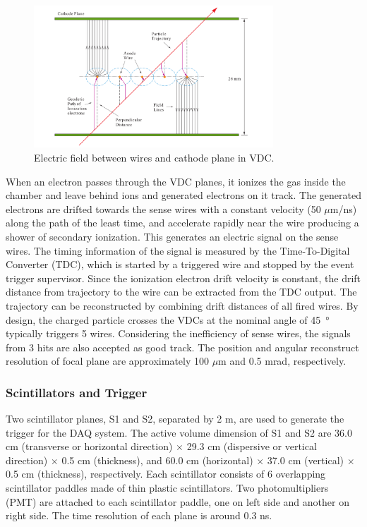 \begin{figure}[tb!]
\centering
\includegraphics[width=0.8\textwidth]{figs/wire_chamber.png}
\caption[wire chamber]{Electric field between wires and cathode plane in VDC.
\label{fig:wire_chamber}}
\end{figure}

When an electron passes through the VDC planes, it ionizes the gas inside the chamber and leave behind ions and
generated electrons on it track. The generated electrons are drifted towards the sense wires with a constant velocity
(50 $\mu$m/ns) along the path of the least time, and accelerate rapidly near the wire producing a shower of secondary ionization.
This generates an electric signal on the sense wires. The timing information of the signal is measured by the Time-To-Digital
Converter (TDC), which is started by a triggered wire and stopped by the event trigger supervisor.
Since the ionization electron drift velocity is constant, the drift distance from trajectory to the wire can be
extracted from the TDC output. The trajectory can be reconstructed by combining drift distances of all fired wires.
By design, the charged particle crosses the VDCs at the nominal angle of \SI{45}{\degree} typically triggers 5 wires.
Considering the inefficiency of sense wires, the signals from 3 hits are also accepted as good track. 
The position and angular reconstruct resolution of focal plane are approximately 100 $\mu$m and 0.5 mrad, respectively.

\subsubsection{Scintillators and Trigger}
Two scintillator planes, S1 and S2, separated by 2 m, are used to generate the trigger for the DAQ system.
The active volume dimension of S1 and S2 are 36.0 cm (transverse or horizontal direction) $\times$ 29.3 cm (dispersive
or vertical direction) $\times$ 0.5 cm (thickness), and 60.0 cm (horizontal) $\times$ 37.0 cm (vertical) $\times$ 0.5
cm (thickness), respectively.
Each scintillator consists of 6 overlapping scintillator paddles made of thin plastic scintillators. 
Two photomultipliers (PMT) are attached to each scintillator paddle, one on left side and another on right side.
The time resolution of each plane is around 0.3 ns.

